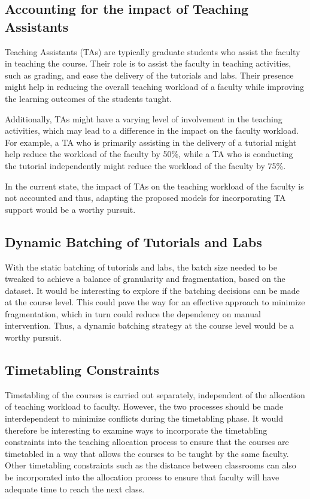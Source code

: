 \subsection{Accounting for the impact of Teaching Assistants}

Teaching Assistants (TAs) are typically graduate students who assist the faculty in teaching the course. Their role is to assist the faculty in teaching activities, such as grading, and ease the delivery of the tutorials and labs. Their presence might help in reducing the overall teaching workload of a faculty while improving the learning outcomes of the students taught.

Additionally, TAs might have a varying level of involvement in the teaching activities, which may lead to a difference in the impact on the faculty workload. For example, a TA who is primarily assisting in the delivery of a tutorial might help reduce the workload of the faculty by 50\%, while a TA who is conducting the tutorial independently might reduce the workload of the faculty by 75\%.

In the current state, the impact of TAs on the teaching workload of the faculty is not accounted and thus, adapting the proposed models for incorporating TA support would be a worthy pursuit.

\subsection{Dynamic Batching of Tutorials and Labs}

With the static batching of tutorials and labs, the batch size needed to be tweaked to achieve a balance of granularity and fragmentation, based on the dataset. It would be interesting to explore if the batching decisions can be made at the course level. This could pave the way for an effective approach to minimize fragmentation, which in turn could reduce the dependency on manual intervention. Thus, a dynamic batching strategy at the course level would be a worthy pursuit.

\subsection{Timetabling Constraints}

Timetabling of the courses is carried out separately, independent of the allocation of teaching workload to faculty. However, the two processes should be made interdependent to minimize conflicts during the timetabling phase. It would therefore be interesting to examine ways to incorporate the timetabling constraints into the teaching allocation process to ensure that the courses are timetabled in a way that allows the courses to be taught by the same faculty. Other timetabling constraints such as the distance between classrooms can also be incorporated into the allocation process to ensure that faculty will have adequate time to reach the next class.
